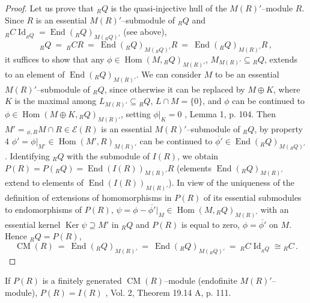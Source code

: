 \documentclass[a4paper,11pt]{article}
\DeclareMathOperator{\Id}{Id}
\DeclareMathOperator{\Ker}{Ker}
\DeclareMathOperator{\Hom}{Hom}
\DeclareMathOperator{\End}{End}
\DeclareMathOperator{\CM}{CM}
\begin{document}
\begin{proof}
Let us prove that ${}_R Q$ is the quasi-injective hull of the $M(R)'$--module 
$R$. Since $R$ is an essential $M(R)'$--submodule of ${}_R Q$ and
${{}_R C \Id_{{}_R Q}=\End({}_R Q)_{M({}_R Q)'}}$ (see above),
\[
{}_R Q\ =\ {}_R C R\ =\ \End({}_R Q)_{M({}_R Q)'} R\ =\ 
\End({}_R Q)_{M(R)'} R\,,
\]
it suffices to show that any ${\phi\in \Hom(M, {}_R Q)_{M(R)'}}$, 
${M_{M(R)'}\subseteq {}_R Q}$, extends to an element of $\End({}_R Q)_{M(R)'}$. 
We can consider $M$ to be an essential $M(R)'$--submodule of ${}_R Q$, since 
otherwise it can be replaced by ${M\oplus K}$, where $K$ is the maximal among 
${L_{M(R)'}\subseteq {}_R Q}$, ${L\cap M=\{0\}}$, and $\phi$ can be 
continued to ${\phi\in \Hom(M\oplus K, {}_R Q)_{M(R)'}}$, setting ${\phi|_K=0}$ 
\cite{Lamb}, Lemma 1, p. 104. Then 
${M'={}_{\phi, R} M\cap R\in \mathcal{E}(R)}$ is an essential 
$M(R)'$--submodule of ${}_R Q$, by property 4 
${\phi'=\phi|_{M'}\in \Hom(M', R)_{M(R)'}}$ can be continued to 
${\overline{\phi'}\in \End({}_R Q)_{M({}_R Q)'}}$. Identifying ${}_R Q$ with the 
submodule of $I(R)$, we obtain ${P(R)=P({}_R Q)=\End(I(R))_{M(R)'} R}$ (elements 
$\End({}_R Q)_{M(R)'}$ extend to elements of $\End(I(R))_{M(R)'}$). 
In view of the uniqueness of the definition of extensions of homomorphisms in $P(R)$ 
of its essential submodules to endomorphisms of $P(R)$, 
${\psi=\phi-\overline{\phi'}|_M\in \Hom(M, {}_R Q)_{M(R)'}}$ with an essential 
kernel ${\Ker \psi\supseteq M'}$ in ${}_R Q$ and $P(R)$ is equal to zero,
${\phi=\overline{\phi'}}$ on $M$. Hence ${{}_R Q=P(R)}$, 
\[
\CM(R)\ =\ \End({}_R Q)_{M(R)'}\ =\ 
\End({}_R Q)_{M({}_R Q)'}\ =\ {}_R C \Id_{{}_R Q}\cong {}_R C\,.
\]
\end{proof}                   

If $P(R)$ is a finitely generated $\CM(R)$--module (endofinite 
$M(R)'$--module), ${P(R)=I(R)}$ \cite{Fe}, Vol. 2, 
Theorem 19.14 A, p. 111.
\end{document}
